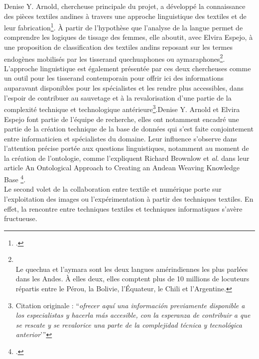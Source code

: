 Denise Y. Arnold, chercheuse principale du projet, a développé la connaissance des pièces textiles andines à travers une approche linguistique des textiles et de leur fabrication\footcite{arnoldHaciaTerminologiaAndina2011}. À partir de l'hypothèse que l'analyse de la langue permet de comprendre les logiques de tissage des femmes, elle aboutit, avec Elvira Espejo, à une proposition de classification des textiles andins reposant sur les termes endogènes mobilisés par les tisserand quechuaphones ou aymaraphones\footnote{\cite{arnoldCienciaTejerAndes2019} \\ Le quechua et l'aymara sont les deux langues amérindiennes les plus parlées dans les Andes. À elles deux, elles comptent plus de 10 millions de locuteurs répartis entre le Pérou, la Bolivie, l'Équateur, le Chili et l'Argentine.}. L'approche linguistique est également présentée par ces deux chercheuses comme un outil pour les tisserand contemporain pour \og offrir ici des informations auparavant disponibles pour les spécialistes et les rendre plus accessibles, dans l'espoir de contribuer au sauvetage et à la revalorisation d'une partie de la complexité technique et technologique antérieure\footnote{\cite[p.~8]{arnoldCienciaTejerAndes2019} Citation originale : \textquotedblleft \textit{ofrecer aquí una información previamente disponible a los especialistas y hacerla más accesible, con la esperanza de contribuir a que se rescate y se revalorice una parte de la complejidad técnica y tecnológica anterior}'\textquotedblright}.\fg \:Denise Y. Arnold et Elvira Espejo font partie de l'équipe de recherche, elles ont notamment encadré une partie de la création technique de la base de données qui s'est faite conjointement entre informaticien et spécialistes du domaine. Leur influence s'observe dans l'attention précise portée aux questions linguistiques, notamment au moment de la création de l'ontologie, comme l'expliquent Richard Brownlow et \textit{al.} dans leur article \og An Ontological Approach to Creating an Andean Weaving Knowledge Base \fg\footcite{brownlowOntologicalApproachCreating2015}.\\

Le second volet de la collaboration entre textile et numérique porte sur l'exploitation des images ou l'expérimentation à partir des techniques textiles. En effet, la rencontre entre techniques textiles et techniques informatiques s'avère fructueuse.

